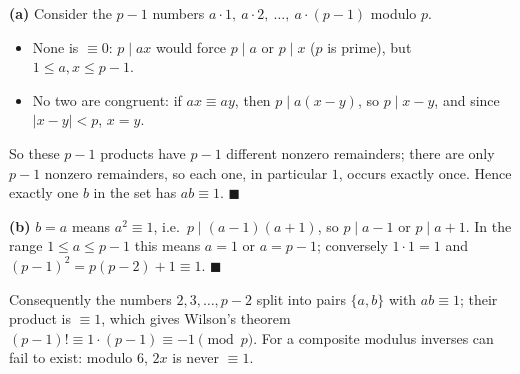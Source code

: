 \textbf{(a)} Consider the $p-1$ numbers $a\cdot1,\ a\cdot2,\ \dots,\ a\cdot(p-1)$ modulo $p$.
\begin{itemize}
\item None is $\equiv0$: $p\mid ax$ would force $p\mid a$ or $p\mid x$ ($p$ is prime), but $1\le a,x\le p-1$.
\item No two are congruent: if $ax\equiv ay$, then $p\mid a(x-y)$, so $p\mid x-y$, and since $|x-y|<p$, $x=y$.
\end{itemize}
So these $p-1$ products have $p-1$ different nonzero remainders; there are only $p-1$ nonzero remainders, so each one, in particular $1$, occurs exactly once. Hence exactly one $b$ in the set has $ab\equiv1$. $\blacksquare$

\textbf{(b)} $b=a$ means $a^2\equiv1$, i.e.\ $p\mid(a-1)(a+1)$, so $p\mid a-1$ or $p\mid a+1$. In the range $1\le a\le p-1$ this means $a=1$ or $a=p-1$; conversely $1\cdot1=1$ and $(p-1)^2=p(p-2)+1\equiv1$. $\blacksquare$

Consequently the numbers $2,3,\dots,p-2$ split into pairs $\{a,b\}$ with $ab\equiv1$; their product is $\equiv1$, which gives Wilson's theorem $(p-1)!\equiv1\cdot(p-1)\equiv-1\pmod p$. For a composite modulus inverses can fail to exist: modulo $6$, $2x$ is never $\equiv1$.
